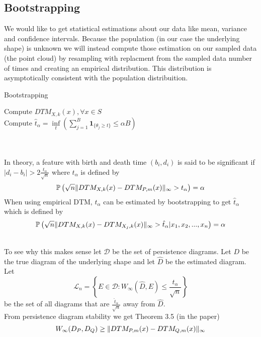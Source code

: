 \documentclass[11pt]{article}
\theoremstyle{definition}
\theoremstyle{definition}
\begin{document}
\subsection{Bootstrapping}
We would like to get statistical estimations about our data like mean, variance and confidence intervals. Because the population (in our case the underlying shape) is unknown we will instead compute those estimation on our sampled data (the point cloud) by resampling with replacment from the sampled data number of times and creating an empirical distribution. This distribution is asymptotically consistent with the population distribuition.\\
$\text{ }$\\
\begin{algorithm}[H]
\caption{Bootstrapping}
\SetAlgoLined
{}
Compute $DTM_{X,k}(x), \forall x \in S$\\
Compute $\hat t_\alpha = \underset{t}{\inf} \left(\sum_{j=1}^B \textbf{1}_{\{\theta_j \geq t\}} \leq \alpha B \right)$\\

\end{algorithm}

\text{ }\\
\text{ }\\
In theory, a feature with birth and death time $(b_i,d_i)$ is said to be significant if $|d_i - b_i| > 2\frac{t_\alpha}{\sqrt{n}}$ where $t_\alpha$ is defined by
$$\mathbb{P} \left( \sqrt{n} \mathopen\| DTM_{X,k}(x) - DTM_{P,m}(x) \mathclose\|_\infty > t_\alpha \right) = \alpha$$
When using empirical DTM, $t_\alpha$ can be estimated by bootstrapping to get $\hat t_\alpha$ which is defined by
$$\mathbb{P} \left( \sqrt{n} \mathopen\| DTM_{X,k}(x) - DTM_{X_j,k}(x) \mathclose\|_\infty > \hat t_\alpha | x_1,x_2,...,x_n \right) = \alpha$$

\text{ }\\
To see why this makes sense let $\mathcal{D}$ be the set of persistence diagrams. Let $D$ be the true diagram of the underlying shape and let $\hat D$ be the estimated diagram. Let
$$\mathcal{L}_n = \left\{ E \in \mathcal{D} : W_\infty(\hat D, E) \leq \frac{\hat t_\alpha}{\sqrt{n}} \right\}$$
be the set of all diagrams that are $\frac{\hat t_\alpha}{\sqrt{n}}$ away from $\hat D$.\\
From persistence diagram stability we get Theorem 3.5 (in the paper)
$$W_\infty (D_P,D_Q) \geq \mathopen\| DTM_{P,m}(x) - DTM_{Q,m}(x) \mathclose\|_\infty$$
\end{document}
